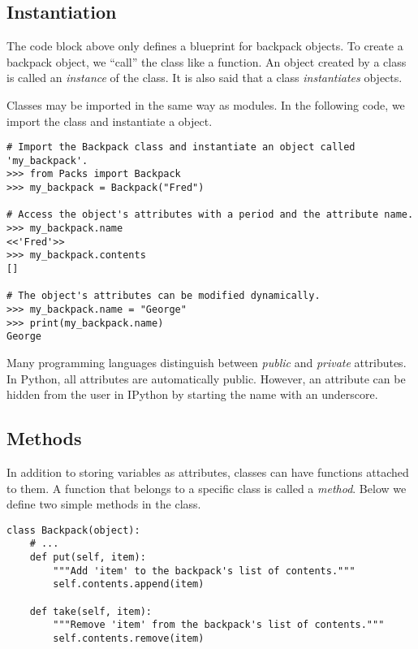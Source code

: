 \subsection*{Instantiation} %

The  code block above only defines a blueprint for backpack objects.
To create a backpack object, we ``call'' the class like a function.
An object created by a class is called an \emph{instance} of the class.
It is also said that a class \emph{instantiates} objects.

Classes may be imported in the same way as modules.
In the following code, we import the  class and instantiate a  object.

\begin{lstlisting}
# Import the Backpack class and instantiate an object called 'my_backpack'.
>>> from Packs import Backpack
>>> my_backpack = Backpack("Fred")

# Access the object's attributes with a period and the attribute name.
>>> my_backpack.name
<<'Fred'>>
>>> my_backpack.contents
[]

# The object's attributes can be modified dynamically.
>>> my_backpack.name = "George"
>>> print(my_backpack.name)
George
\end{lstlisting}

\begin{info}
Many programming languages distinguish between \emph{public} and \emph{private} attributes.
In Python, all attributes are automatically public.
However, an attribute can be hidden from the user in IPython by starting the name with an underscore. %
\end{info}

\subsection*{Methods} %

In addition to storing variables as attributes, classes can have functions attached to them.
A function that belongs to a specific class is called a \emph{method}.
Below we define two simple methods in the  class.

\begin{lstlisting}
class Backpack(object):
    # ...
    def put(self, item):
        """Add 'item' to the backpack's list of contents."""
        self.contents.append(item)
    
    def take(self, item):
        """Remove 'item' from the backpack's list of contents."""
        self.contents.remove(item)
\end{lstlisting}

